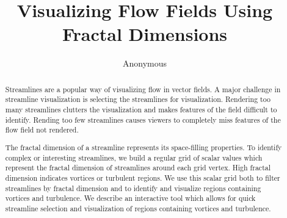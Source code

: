 \documentclass{egpubl}
\title{Visualizing Flow Fields Using Fractal Dimensions}
\author{Anonymous}
\begin{document}
\maketitle

\begin{abstract}
Streamlines are a popular way of visualizing flow in vector fields.
A major challenge in streamline visualization is selecting the streamlines
for visualization.
Rendering too many streamlines clutters the visualization and makes
features of the field difficult to identify. 
Rending too few streamlines causes viewers to completely miss features
of the flow field not rendered. 

The fractal dimension of a streamline represents its space-filling properties.
To identify complex or interesting streamlines, 
we build a regular grid of scalar values 
which represent the fractal dimension of streamlines around each grid vertex.
High fractal dimension indicates vortices or turbulent regions.
We use this scalar grid both to filter streamlines by fractal dimension
and to identify and visualize regions containing vortices and turbulence.
We describe an interactive tool which allows for quick streamline selection
and visualization of regions containing vortices and turbulence.
\end{abstract}







\renewcommand{\textfraction}{0.2}
\renewcommand{\dbltopfraction}{0.8}	
\renewcommand{\topfraction}{0.8}	


\end{document}
